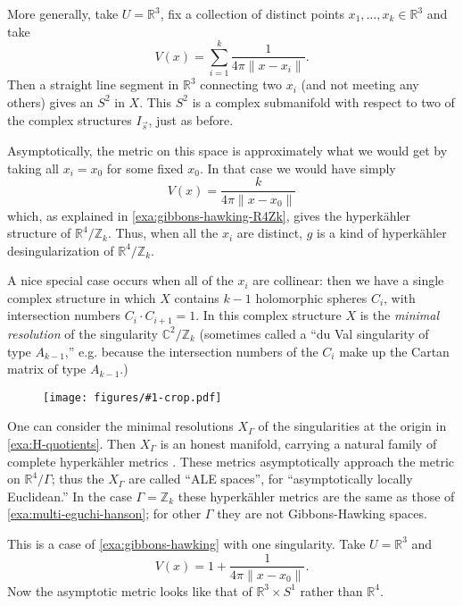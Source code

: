 \documentclass[12pt,letterpaper,reqno]{article}
\numberwithin{equation}{section}
\newcommand{\R}{\ensuremath{\mathbb R}}
\newcommand{\C}{\ensuremath{\mathbb C}}
\newcommand{\Z}{\ensuremath{\mathbb Z}}
\newcommand{\hk}{hyperk\"ahler\xspace}
\newcommand{\norm}[1]{\lVert#1\rVert}
\newcommand{\ti}[1]{\textit{#1}}
\newcommand{\insfig}[2]{\begin{figure}[htbp] \centering \texttt{[image: figures/\#1-crop.pdf]} \label{fig:#1} \end{figure}}
\begin{document}
\begin{example} \cite{MR520463} \label{exa:multi-eguchi-hanson} More generally, take $U = \R^3$, fix a collection
of distinct points $x_1, \dots, x_k \in \R^3$ and take
\begin{equation}
  V(x) = \sum_{i=1}^k \frac{1}{4 \pi \norm{x - x_i}}.
\end{equation}
Then a straight line segment in $\R^3$ connecting two $x_i$ (and not meeting any others)
gives an $S^2$ in $X$. This $S^2$ is a complex submanifold with respect to two of the complex structures $I_{\vec s}$, just as before.

Asymptotically, the metric on this space is approximately
what we would get by taking all $x_i = x_0$ for some fixed $x_0$. 
In that case we would have simply 
\begin{equation}
 V(x) = \frac{k}{4 \pi \norm{x - x_0}}
\end{equation}
which, as explained in \autoref{exa:gibbons-hawking-R4Zk},
gives the \hk structure of $\R^4 / \Z_k$.
Thus, when all the $x_i$ are distinct,
$g$ is a kind of \hk desingularization of $\R^4 / \Z_k$.

A nice special case occurs when all of the $x_i$ are collinear:
then we have a single complex structure in which $X$ contains $k-1$
holomorphic spheres $C_i$, with intersection numbers
$C_i \cdot C_{i+1} = 1$. In this complex structure $X$ is 
the \ti{minimal resolution} of the singularity $\C^2 / \Z_k$
(sometimes called a ``du Val singularity of type $A_{k-1}$,'' e.g.
because the intersection numbers of the $C_i$ make up the
Cartan matrix of type $A_{k-1}$.)
\end{example}

\insfig{higgs-bundles-5}{0.9}

\begin{example} \label{exa:ALE-spaces}
One can consider the minimal resolutions $X_\Gamma$
of the singularities at the origin in \autoref{exa:H-quotients}.
Then $X_\Gamma$ is an honest manifold, 
carrying a natural family 
of complete \hk metrics \cite{MR90d:53055}.
These metrics asymptotically approach
the metric on $\R^4 / \Gamma$;
thus the $X_\Gamma$ are called ``ALE spaces'',
for ``asymptotically locally Euclidean.''
In the case $\Gamma = \Z_k$ these \hk metrics are
the same as those of \autoref{exa:multi-eguchi-hanson};
for other $\Gamma$ they are not Gibbons-Hawking spaces.
\end{example}

\begin{example}
This is a case of \autoref{exa:gibbons-hawking}
with one singularity. 
Take $U = \R^3$ and
\begin{equation}
  V(x) = 1 + \frac{1}{4\pi \norm{x-x_0}}.
\end{equation}
Now the asymptotic metric looks like that of $\R^3 \times S^1$
rather than $\R^4$.
\end{example}
\end{document}
